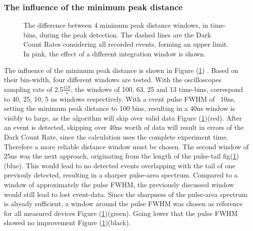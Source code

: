 \documentclass[12pt,article,type=msc,colorback,accentcolor=tud9c]{tudthesis}
\begin{document}
\subsubsection{The influence of the minimum peak distance}
\label{subsec:subsec_mpd}
\begin{figure}[h]
\begin{centering}
\caption[MPD parameter challenges and the integration window]{The difference between 4 minimum peak distance windows, in time-bins, during the peak detection. The dashed lines are the Dark Count Rates considering all recorded events, forming an upper limit. In pink, the effect of a different integration window is shown.}
\label{fig:MPD_plot}
\end{centering}
\end{figure}
The influence of the minimum peak distance is shown in Figure (\ref{fig:MPD_plot}) . Based on their bin-width, four different windows are tested. With the oscilloscopes sampling rate of 2.5$\frac{GS}{s}$, the windows of 100, 63, 25 and 13 time-bins, correspond to 40, 25, 10, 5 ns windows respectively. With a event pulse FWHM of ~10ns, setting the minimum peak distance to 100 bins, resulting in a 40ns window is visibly to large, as the algorithm will skip over valid data Figure (\ref{fig:MPD_plot})(red). After an event is detected, skipping over 40ns worth of data will result in errors of the Dark Count Rate, since the calculation uses the complete experiment time. Therefore a more reliable distance window must be chosen. The second window of 25ns was the next approach, originating from the length of the pulse-tail fig(\ref{fig:MPD_plot})(blue). This would lead to no detected events overlapping with the tail of one previouly detected, resulting in a sharper pulse-area spectrum. Compared to a window of approximately the pulse FWHM, the previously discussed window would still lead to lost event-data. Since the sharpness of the pulse-area spectrum is already sufficient, a window around the pulse FWHM was chosen as reference for all measured devices Figure (\ref{fig:MPD_plot})(green). Going lower that the pulse FWHM showed no improvement Figure (\ref{fig:MPD_plot})(black). 
\end{document}
